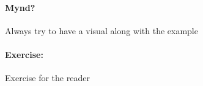 \documentclass{article}
\begin{document}
\paragraph{Mynd?} Always try to have a visual along with the example

\paragraph{Exercise:} Exercise for the reader


%
\end{document}
